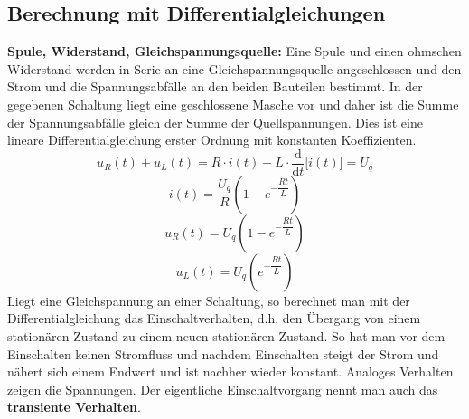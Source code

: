 \subsection{Berechnung mit Differentialgleichungen}
\textbf{Spule, Widerstand, Gleichspannungsquelle:} Eine Spule und einen ohmschen Widerstand werden in Serie an eine Gleichspannungsquelle angeschlossen und den Strom und die Spannungsabfälle an den beiden Bauteilen bestimmt. In der gegebenen Schaltung liegt eine geschlossene Masche vor und daher ist die Summe der Spannungsabfälle gleich der Summe der Quellspannungen. Dies ist eine lineare Differentialgleichung erster Ordnung mit konstanten Koeffizienten.
\begin{equation}
\boxed{u_R\left(t\right)+u_L\left(t\right)=R\cdot i\left(t\right)+L\cdot \dfrac{\text{d}}{\text{d}t}\Big[i\left(t\right)\Big]=U_q}
\end{equation}
\begin{equation}
\boxed{i\left(t\right)=\dfrac{U_q}{R}\left(1-e^{-\dfrac{Rt}{L}}\right)}
\end{equation}
\begin{equation}
\boxed{u_R\left(t\right)=U_q\left(1-e^{-\dfrac{Rt}{L}}\right)}
\end{equation}
\begin{equation}
\boxed{u_L\left(t\right)=U_q\left(e^{-\dfrac{Rt}{L}}\right)}
\end{equation}
Liegt eine Gleichspannung an einer Schaltung, so berechnet man mit der Differentialgleichung das Einschaltverhalten, d.h. den Übergang von einem stationären Zustand zu einem neuen stationären Zustand. So hat man vor dem Einschalten keinen Stromfluss und nachdem Einschalten steigt der Strom und nähert sich einem Endwert und ist nachher wieder konstant. Analoges Verhalten zeigen die Spannungen. Der eigentliche Einschaltvorgang nennt man auch das \textbf{transiente Verhalten}.

